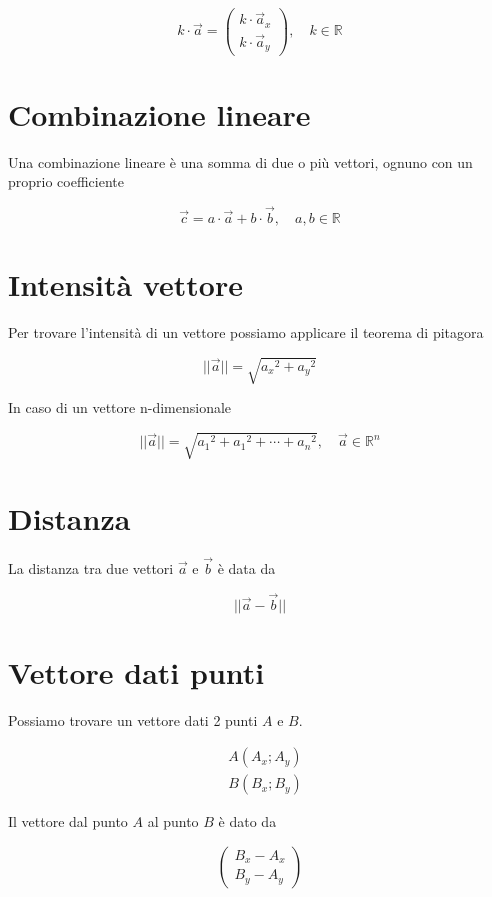 \documentclass{article}
\begin{document}
\[
    k\cdot\vec{a} =
    \begin{pmatrix}
        k\cdot \vec{a}_x \\
        k\cdot \vec{a}_y
    \end{pmatrix},
    \quad k\in\mathbb{R}
\]

\section{Combinazione lineare}

Una combinazione lineare è una somma di due o più vettori, ognuno con un proprio coefficiente

\[
    \vec{c} = a \cdot\vec{a} + b\cdot\vec{b},
    \quad a,b\in \mathbb{R}
\]

\section{Intensità vettore}

Per trovare l'intensità di un vettore possiamo applicare il teorema di pitagora

\[
    ||\vec{a}|| = \sqrt{{a_x}^2 + {a_y}^2}
\]

In caso di un vettore n-dimensionale

\[
    ||\vec{a}|| = \sqrt{{a_1}^2 + {a_1}^2 + \cdots + {a_n}^2},
    \quad \vec{a}\in\mathbb{R}^n
\]

\section{Distanza}

La distanza tra due vettori \(\vec{a}\) e \(\vec{b}\) è data da

\[
    ||\vec{a}-\vec{b}||
\]

\section{Vettore dati punti}

Possiamo trovare un vettore dati 2 punti \(A\) e \(B\).

\begin{align*}
    &A(A_x; A_y) \\
    &B(B_x; B_y)
\end{align*}

Il vettore dal punto \(A\) al punto \(B\) è dato da

\[
    \begin{pmatrix}
        B_x - A_x \\
        B_y - A_y
    \end{pmatrix}
\]
\end{document}
